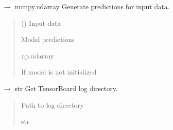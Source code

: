\documentclass[letterpaper,10pt,english]{sphinxmanual}
\begin{document}

\begin{fulllineitems}
\label{\detokenize{autoapi/src/RNNTrainer/index:src.RNNTrainer.predict}}
\pysigstartsignatures
\pysiglinewithargsret
{}
{}
{{ $\rightarrow$ numpy.ndarray}}
\pysigstopsignatures
\sphinxAtStartPar
Generate predictions for input data.
\begin{quote}\begin{description}
\sphinxAtStartPar
{} () \textendash{} Input data

\sphinxAtStartPar
Model predictions

\sphinxAtStartPar
np.ndarray

\sphinxAtStartPar
{} \textendash{} If model is not initialized

\end{description}\end{quote}

\end{fulllineitems}


\begin{fulllineitems}
\label{\detokenize{autoapi/src/RNNTrainer/index:src.RNNTrainer.get_log_dir}}
\pysigstartsignatures
\pysiglinewithargsret
{}
{}
{{ $\rightarrow$ str}}
\pysigstopsignatures
\sphinxAtStartPar
Get TensorBoard log directory.
\begin{quote}\begin{description}
\sphinxAtStartPar
Path to log directory

\sphinxAtStartPar
str

\end{description}\end{quote}

\end{fulllineitems}
\end{document}
